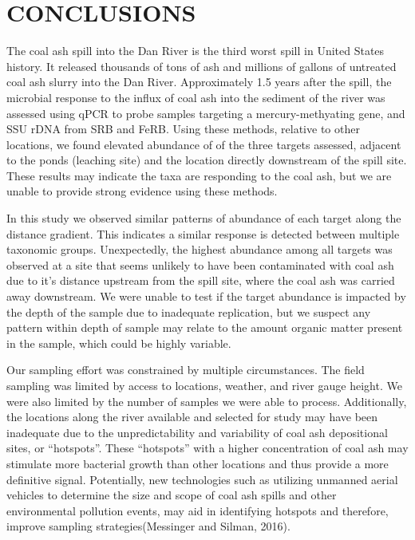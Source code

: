 \documentclass[ms, hidelinks]{uncgdissertationexp}
\theoremstyle{plain}
\theoremstyle{definition}
\theoremstyle{remark}
\begin{document}
\hypertarget{conclusions}{%
\chapter{CONCLUSIONS}\label{conclusions}}

The coal ash spill into the Dan River is the third worst spill in United States history. It released thousands of tons of ash and millions of gallons of untreated coal ash slurry into the Dan River. Approximately 1.5 years after the spill, the microbial response to the influx of coal ash into the sediment of the river was assessed using qPCR to probe samples targeting a mercury-methyating gene, and SSU rDNA from SRB and FeRB. Using these methods, relative to other locations, we found elevated abundance of of the three targets assessed, adjacent to the ponds (leaching site) and the location directly downstream of the spill site. These results may indicate the taxa are responding to the coal ash, but we are unable to provide strong evidence using these methods.

In this study we observed similar patterns of abundance of each target along the distance gradient. This indicates a similar response is detected between multiple taxonomic groups. Unexpectedly, the highest abundance among all targets was observed at a site that seems unlikely to have been contaminated with coal ash due to it's distance upstream from the spill site, where the coal ash was carried away downstream. We were unable to test if the target abundance is impacted by the depth of the sample due to inadequate replication, but we suspect any pattern within depth of sample may relate to the amount organic matter present in the sample, which could be highly variable.

Our sampling effort was constrained by multiple circumstances. The field sampling was limited by access to locations, weather, and river gauge height. We were also limited by the number of samples we were able to process. Additionally, the locations along the river available and selected for study may have been inadequate due to the unpredictability and variability of coal ash depositional sites, or ``hotspots''. These ``hotspots'' with a higher concentration of coal ash may stimulate more bacterial growth than other locations and thus provide a more definitive signal. Potentially, new technologies such as utilizing unmanned aerial vehicles to determine the size and scope of coal ash spills and other environmental pollution events, may aid in identifying hotspots and therefore, improve sampling strategies(Messinger and Silman, 2016).
\end{document}
